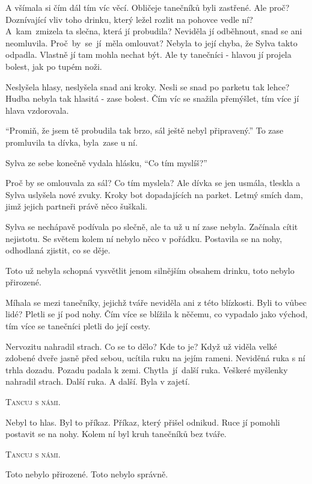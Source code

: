 \documentclass[10pt]{article}
\begin{document}
\begin{spacing}{1}
	A všímala si čím dál tím víc věcí.
	Obličeje tanečníků byli zastřené.
	Ale proč?
	Doznívající vliv toho drinku, který ležel rozlit na pohovce vedle ní?
	A~kam~zmizela ta slečna, která jí probudila?
	Neviděla jí odběhnout, snad se ani neomluvila.
	Proč~by~se~jí~měla omlouvat?
	Nebyla to její chyba, že Sylva takto odpadla.
	Vlastně jí tam mohla nechat být.
	Ale ty tanečníci - hlavou jí projela bolest, jak po tupém noži.\par
	Neslyšela hlasy, neslyšela snad ani kroky.
	Nesli se snad po parketu tak lehce?
	Hudba nebyla tak hlasitá - zase bolest.
	Čím víc se snažila přemýšlet, tím více jí hlava vzdorovala.\par
	\enquote{Promiň, že jsem tě probudila tak brzo, sál ještě nebyl připravený.}
	To zase promluvila ta dívka, byla~zase u ní.\par
	Sylva ze sebe konečně vydala hlásku, \enquote{Co tím myslíš?}\par
	Proč by se omlouvala za sál?
	Co tím myslela?
	Ale dívka se jen usmála, tleskla a Sylva uslyšela nové zvuky.
	Kroky bot dopadajících na parket.
	Letmý smích dam, jimž jejich partneři právě něco šuškali.\par
	Sylva se nechápavě podívala po slečně, ale ta už u ní zase nebyla.
	Začínala cítit nejistotu.
	Se světem kolem ní nebylo něco v pořádku.
	Postavila se na nohy, odhodlaná zjistit, co se děje.\par
	Toto už nebyla schopná vysvětlit jenom silnějším obsahem drinku,
	toto nebylo přirozené.\par
	Míhala se mezi tanečníky, jejichž tváře neviděla ani z této blízkosti.
	Byli to vůbec lidé?
	Pletli se jí pod nohy.
	Čím více se blížila k něčemu, co vypadalo jako východ,
	tím více se tanečníci pletli do její cesty.\par
	Nervozitu nahradil strach.
	Co se to dělo?
	Kde to je?
	Když už viděla velké zdobené dveře jasně před sebou, ucítila ruku na jejím rameni.
	Neviděná ruka s ní trhla dozadu.
	Pozadu padala k zemi.
	Chytla~jí~další ruka.
	Veškeré myšlenky nahradil strach.
	Další ruka.
	A další.
	Byla v zajetí.\par
	\textsc{Tancuj s námi.}\par
	Nebyl to hlas.
	Byl to příkaz.
	Příkaz, který přišel odnikud.
	Ruce jí pomohli postavit se na nohy.
	Kolem ní byl kruh tanečníků bez tváře.\par
	\textsc{Tancuj s námi.}\par
	Toto nebylo přirozené.
	Toto nebylo správně.\par

\end{spacing}
\end{document}
